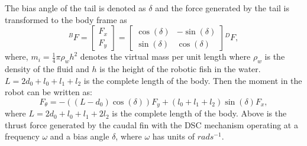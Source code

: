 \documentclass[pdflatex,sn-mathphys-num]{sn-jnl}
\theoremstyle{thmstyleone}%
\begin{document}
The bias angle of the tail is denoted as $\delta$ and the force generated by the tail is transformed to the body frame as
\begin{equation}
    {}^{B}F = 
    \begin{bmatrix}
        F_x \\
        F_y
    \end{bmatrix}
    =
    \begin{bmatrix} 
        \cos(\delta) & -\sin(\delta) 
        \\ \sin(\delta) & \cos(\delta) 
    \end{bmatrix} 
    {}^{D}F,
    \label{eq:fxy}
\end{equation}
where, $m_i = \frac{1}{4} \pi \rho_w h^2$ denotes the virtual mass per unit length where $\rho_w$ is the density of the fluid and $h$ is the height of the robotic fish in the water. $L = 2d_0 + l_0 + l_1 + l_2$ is the complete length of the body. Then the moment in the robot can be written as:
\begin{equation}
    F_{\theta} = - \left( (L - d_0) \cos(\delta) \right) F_y + (l_0 + l_1 + l_2) \sin(\delta) F_x,
    \label{eq:theta}
\end{equation}
where $L = 2d_0 + l_0 + l_1 + 2l_2$ is the complete length of the body. Above is the thrust force generated by the caudal fin with the DSC mechanism operating at a frequency $\omega$ and a bias angle $\delta$, where $\omega$ has units of $rads^{-1}$. 
\end{document}
